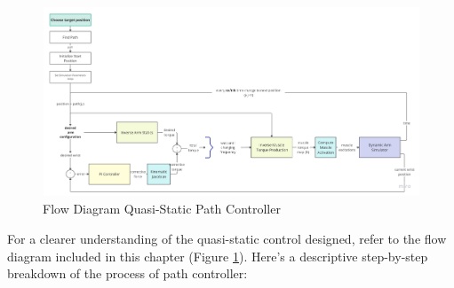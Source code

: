 \begin{figure}[h!]
    \centering
    \includegraphics[width=1\textwidth]{Pictures/Controller/Quasi-Static Path Controller.jpg}
    \caption{Flow Diagram Quasi-Static Path Controller }
    \label{fig:PathController}
\end{figure}
\newpage
For a clearer understanding of the quasi-static control designed, refer to the flow diagram included in this chapter (Figure \ref{fig:PathController}). Here’s a descriptive step-by-step breakdown of the process of path controller:

